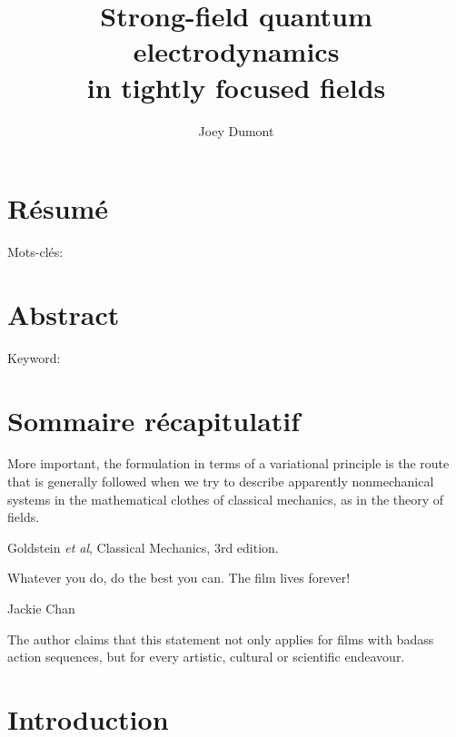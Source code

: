 \documentclass[11pt,SymmetricalJury]{inrsthesis/inrsthesis}
\title{Strong-field quantum electrodynamics \\ in tightly focused fields}
\author{Joey Dumont}
\begin{document}
\frontmatter

\maketitle

\chapter{Résumé}

Mots-clés:

\chapter{Abstract}

Keyword:

\chapter{Sommaire récapitulatif}
\cleardoublepage

\tableofcontents
\cleardoublepage

\listoftables
\cleardoublepage

\listoffigures
\cleardoublepage


\epigraph{More important, the formulation in terms of a variational principle is the route
          that is generally followed when we try to describe apparently nonmechanical systems
          in the mathematical clothes of classical mechanics, as in the theory of fields.}{Goldstein \textit{et al}, Classical Mechanics, 3rd edition.}
\cleardoublepage

\epigraph{Whatever you do, do the best you can. The film lives forever!}{Jackie Chan}

\begin{flushright}
\begin{minipage}{0.35\textwidth}
The author claims that this statement not only applies for films with badass
action sequences, but for every artistic, cultural or scientific endeavour.
\end{minipage}
\end{flushright}

\cleardoublepage
\mainmatter

\chapter{Introduction}
\end{document}

